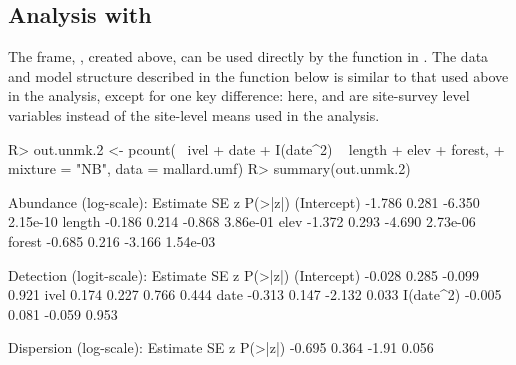 \documentclass[codesnippet]{jss}
\begin{document}
\subsection[Analysis with unmarked]{Analysis with }
The  frame, , created above, can be used directly by the  function in . The data and model structure described in the  function below is similar to that used above in the  analysis, except for one key difference: here,  and  are site-survey level variables instead of the site-level means used in the  analysis.

\begin{CodeInput}
R> out.unmk.2 <- pcount(~ ivel + date + I(date^2) ~ length + elev + forest,
+    mixture = "NB", data = mallard.umf)
R> summary(out.unmk.2)
\end{CodeInput}
\begin{CodeOutput}
Abundance (log-scale):
             Estimate         SE           z     P(>|z|)
(Intercept)    -1.786      0.281      -6.350    2.15e-10
length         -0.186      0.214      -0.868    3.86e-01
elev           -1.372      0.293      -4.690    2.73e-06
forest         -0.685      0.216      -3.166    1.54e-03

Detection (logit-scale):
             Estimate         SE           z     P(>|z|)
(Intercept)    -0.028      0.285      -0.099       0.921
ivel            0.174      0.227       0.766       0.444
date           -0.313      0.147      -2.132       0.033
I(date^2)      -0.005      0.081      -0.059       0.953

Dispersion (log-scale):
Estimate          SE       z    P(>|z|)
-0.695         0.364   -1.91      0.056
\end{CodeOutput}
\end{document}
